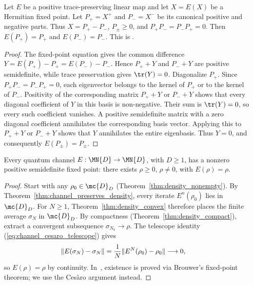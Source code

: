 \begin{theorem}\label{thm:hermitian_fixedpoint_parts}
    \leanok
    Let $E$ be a positive trace-preserving linear map and let $X=E(X)$ be a
    Hermitian fixed point. Let $P_+=X^+$ and $P_-=X^-$ be its canonical
    positive and negative parts. Thus $X=P_+-P_-$, $P_\pm\geq0$, and
    $P_+P_-=P_-P_+=0$. Then $E(P_+)=P_+$ and $E(P_-)=P_-$.
    This is \cite[Proposition~6.8]{Wolf2012Quantum}.
\end{theorem}

\begin{proof}
    \leanok
    The fixed-point equation gives the common difference
    $Y=E(P_+)-P_+=E(P_-)-P_-$. Hence $P_++Y$ and $P_-+Y$ are positive
    semidefinite, while trace preservation gives $\tr(Y)=0$. Diagonalize
    $P_+$. Since $P_+P_-=P_-P_+=0$, each eigenvector belongs to the kernel
    of $P_+$ or to the kernel of $P_-$. Positivity of the corresponding
    matrix $P_++Y$ or $P_-+Y$ shows that every diagonal coefficient of $Y$
    in this basis is non-negative. Their sum is $\tr(Y)=0$, so every such
    coefficient vanishes. A positive semidefinite matrix with a zero diagonal
    coefficient annihilates the corresponding basis vector. Applying this to
    $P_++Y$ or $P_-+Y$ shows that $Y$ annihilates the entire eigenbasis.
    Thus $Y=0$, and consequently $E(P_\pm)=P_\pm$.
\end{proof}

\begin{theorem}\label{thm:cesaro_fixedpoint}
    \leanok
    Every quantum channel $E:\MN{D}\to\MN{D}$, with $D\geq1$, has a nonzero
    positive semidefinite fixed point: there exists $\rho\geq0$, $\rho\neq0$,
    with $E(\rho)=\rho$.
\end{theorem}

\begin{proof}
    \leanok
    Start with any $\rho_0\in\mc{D}_D$
    (Theorem~\ref{thm:density_nonempty}).
    By Theorem~\ref{thm:channel_preserves_density}, every iterate
    $E^n(\rho_0)$ lies in $\mc{D}_D$. For $N\geq1$,
    Theorem~\ref{thm:density_convex} therefore places the finite average
    $\sigma_N$ in $\mc{D}_D$.
    By compactness (Theorem~\ref{thm:density_compact}),
    extract a convergent subsequence $\sigma_{N_k}\to\rho$.
    The telescope identity (\ref{eq:channel_cesaro_telescope}) gives
    \begin{align}
        \lVert E(\sigma_N)-\sigma_N\rVert
         & =\frac{1}{N}\lVert E^N(\rho_0)-\rho_0\rVert
        \longrightarrow0,
        \notag
    \end{align}
    so $E(\rho)=\rho$ by continuity.
    In~\cite[Theorem~6.11]{Wolf2012Quantum}, existence is proved
    via Brouwer's fixed-point theorem; we use the Ces\`aro
    argument instead.
\end{proof}

